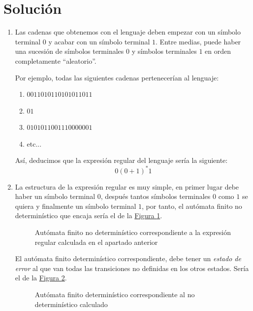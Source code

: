 \documentclass[10pt,a4paper,spanish]{report}
\begin{document}
\section{\textcolor{p2}Solución}
\begin{enumerate}[1.]
\item Las cadenas que obtenemos con el lenguaje deben empezar con un símbolo terminal $0$ y acabar con un símbolo terminal $1$. Entre medias, puede haber una sucesión de símbolos terminales $0$ y símbolos terminales $1$  en orden completamente ``aleatorio''.

Por ejemplo, todas las siguientes cadenas pertenecerían al lenguaje:
\begin{enumerate}[\color{p2}{$\longrightarrow$}]
  \item $0011010110101011011$
  \item $01$
  \item $0101011001110000001$
  \item etc...
\end{enumerate}

Así, deducimos que la expresión regular del lenguaje sería la siguiente:
\begin{displaymath}
0(0+1)^*1
\end{displaymath}

\item La estructura de la expresión regular es muy simple, en primer lugar debe haber un símbolo terminal $0$, después tantos símbolos terminales $0$ como $1$ se quiera y finalmente un símbolo terminal $1$, por tanto, el autómata finito no determinístico que encaja sería el de la \hyperref[autonoder]{Figura \ref*{autonoder}}.

\begin{figure}[!h]
\centering

\caption{Autómata finito no determinístico correspondiente a la expresión regular calculada en el apartado anterior}
\label{autonoder}
\end{figure}

El autómata finito determinístico correspondiente, debe tener un \textit{\textcolor{p2}{estado de error}} al que van todas las transiciones no definidas en los otros estados. Sería el de la \hyperref[autoder]{Figura \ref*{autoder}}.

\begin{figure}[!h]
\centering

\caption{Autómata finito determinístico correspondiente al no determinístico calculado}
\label{autoder}
\end{figure}


\end{enumerate}
\end{document}
